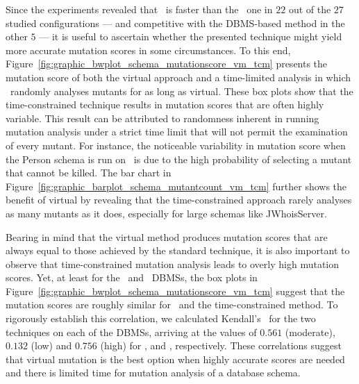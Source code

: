 


 Since the experiments revealed that \vma~is faster than the \Original~one in $22$ out of the $27$ studied configurations --- and competitive with the DBMS-based method in the other $5$ --- it is useful to ascertain whether the presented technique might yield more accurate mutation scores in some circumstances. To this end, Figure~\ref{fig:graphic_bwplot_schema_mutationscore_vm_tcm} presents the mutation score of both the virtual approach and a time-limited analysis in which \Original~randomly analyses mutants for as long as virtual. These box plots show that the time-constrained technique results in mutation scores that are often highly variable. This result can be attributed to randomness inherent in running mutation analysis under a strict time limit that will not permit the examination of every mutant.
%
For instance, the noticeable variability in mutation score when the Person schema is run on \Postgres~is due to the high probability of selecting a mutant that cannot be killed. The bar chart in Figure~\ref{fig:graphic_barplot_schema_mutantcount_vm_tcm} further shows the benefit of virtual by revealing that the time-constrained approach rarely analyses as many mutants as it does, especially for large schemas like JWhoisServer.

Bearing in mind that the virtual method produces mutation scores that are always equal to those achieved by the standard technique, it is also important to observe that time-constrained mutation analysis leads to overly high mutation scores.  Yet, at least for the \HyperSQL~and \SQLite~DBMSs, the box plots in Figure~\ref{fig:graphic_bwplot_schema_mutationscore_vm_tcm} suggest that the mutation scores are roughly similar for \vma~and the time-constrained method. To rigorously establish this correlation, we calculated Kendall's \taub~for the two techniques on each of the DBMSs, arriving at the values of $0.561$ (moderate), $0.132$ (low) and $0.756$ (high) for \HyperSQL, \PostgreSQL and \sqlite, respectively. These correlations suggest that virtual mutation is the best option when highly accurate scores are needed and there is limited time for mutation analysis of a database schema.

